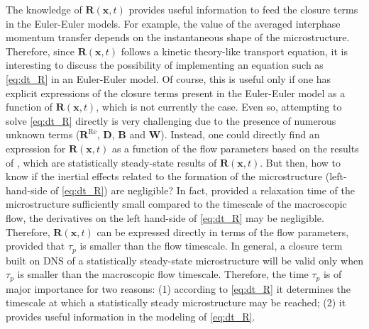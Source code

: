 The knowledge of $\textbf{R}(\textbf{x},t)$ provides useful information to feed the closure terms in the Euler-Euler models.
For example, the value of the averaged interphase momentum transfer depends on the instantaneous shape of the microstructure. 
Therefore, since $\textbf{R}(\textbf{x},t)$ follows a kinetic theory-like transport equation, it is interesting to discuss the possibility of implementing an equation such as \ref{eq:dt_R} in an Euler-Euler model. 
Of course, this is useful only if one has explicit expressions of the closure terms present in the Euler-Euler model as a function of $\textbf{R}(\textbf{x},t)$, which is not currently the case.
Even so, attempting to solve \ref{eq:dt_R} directly is very challenging due to the presence of numerous unknown terms ($\textbf{R}^\text{Re}$, $\textbf{D}$, $\textbf{B}$ and $\textbf{W}$).
Instead, one could directly find an expression for $\textbf{R}(\textbf{x},t)$ as a function of the flow parameters based on the results of \citet{fintzi2024buoyancy}, which are statistically steady-state results of $\textbf{R}(\textbf{x},t)$. 
But then, how to know if the inertial effects related to the formation of the microstructure  (left-hand-side of \ref{eq:dt_R}) are negligible?
In fact, provided a relaxation time of the microstructure sufficiently small compared to the timescale of the macroscopic flow, the derivatives on the left hand-side of \ref{eq:dt_R} may be negligible.
Therefore, $\textbf{R}(\textbf{x},t)$ can be expressed directly in terms of the flow parameters, provided that $\tau_p$ is smaller than the flow timescale. 
In general, a closure term built on DNS of a  statistically steady-state microstructure will be valid only when $\tau_p$ is smaller than the macroscopic flow timescale. 
Therefore, the time $\tau_p$ is of major importance for two reasons: 
(1) according to \ref{eq:dt_R} it determines the timescale at which a statistically steady microstructure may be reached; 
(2) it provides useful information in the modeling of \ref{eq:dt_R}.


